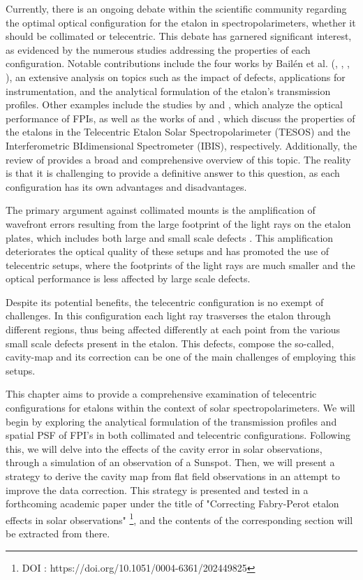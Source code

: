 Currently, there is an ongoing debate within the scientific community regarding the optimal optical configuration for the etalon in spectropolarimeters, whether it should be collimated or telecentric. This debate has garnered significant interest, as evidenced by the numerous studies addressing the properties of each configuration. Notable contributions include the four works by Bailén et al. (\citealt{franI}, \citealt{franII}, \citealt{franIII}, \citealt{franIV}), an extensive analysis on topics such as the impact of defects, applications for instrumentation, and the analytical formulation of the etalon's transmission profiles. Other examples include the studies by \citep{beckers} and \citep{ghosts-etalon}, which analyze the optical performance of FPIs, as well as the works of \citealt{kentischer1998tesos} and \citealt{cavallini2006ibis}, which discuss the properties of the etalons in the Telecentric Etalon Solar Spectropolarimeter (TESOS) and the Interferometric BIdimensional Spectrometer (IBIS), respectively. Additionally, the review of \citealt{fran_review} provides a broad and comprehensive overview of this topic. The reality is that it is challenging to provide a definitive answer to this question, as each configuration has its own advantages and disadvantages.

The primary argument against collimated mounts is the amplification of wavefront errors resulting from the large footprint of the light rays on the etalon plates, which includes both large and small scale defects \citep{fran_review}. This amplification deteriorates the optical quality of these setups and has promoted the use of telecentric setups, where the footprints of the light rays are much smaller and the optical performance is less affected by large scale defects.

Despite its potential benefits, the telecentric configuration is no exempt of challenges. In this configuration each light ray trasverses the etalon through different regions, thus being affected differently at each point from the various small scale defects present in the etalon. This defects, compose the so-called, cavity-map and its correction can be one of the main challenges of employing this setups.

This chapter aims to provide a comprehensive examination of telecentric configurations for etalons within the context of solar spectropolarimeters. We will begin by exploring the analytical formulation of the transmission profiles and spatial PSF of FPI's in both collimated and telecentric configurations. Following this, we will delve into the effects of the cavity error in solar observations, through a simulation of an observation of a Sunspot. Then, we will present a strategy to derive the cavity map from flat field observations in an attempt to improve the data correction. This strategy is presented and tested in a forthcoming academic paper under the title of "Correcting Fabry-Perot etalon effects in solar observations" \footnote{DOI :  https://doi.org/10.1051/0004-6361/202449825}, and the contents of the corresponding section will be extracted from there. 

